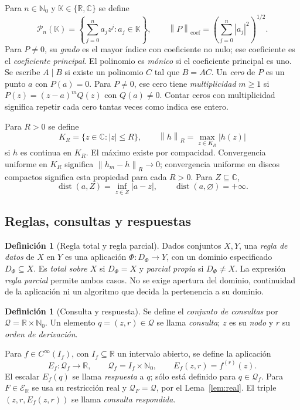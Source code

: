 \documentclass[11pt,a4paper]{article}
\numberwithin{equation}{section}
\theoremstyle{definition}
\newtheorem{definition}[theorem]{Definición}
\theoremstyle{remark}
\newcommand{\R}{\mathbb R}
\newcommand{\C}{\mathbb C}
\newcommand{\Nn}{\mathbb N_0}
\newcommand{\PP}{\mathcal P}
\newcommand{\ER}{\mathcal E_{\R}}
\newcommand{\QQ}{\mathcal Q}
\newcommand{\norm}[1]{\left\lVert#1\right\rVert}
\DeclareMathOperator{\dist}{dist}
\begin{document}
Para $n\in\Nn$ y $\mathbb K\in\{\R,\C\}$ se define
\[
\PP_n(\mathbb K)=\left\{\sum_{j=0}^na_jz^j:a_j\in\mathbb K\right\},\qquad
\norm{P}_{\mathrm{coef}}=\left(\sum_{j=0}^n|a_j|^2\right)^{1/2}.
\]
Para $P\ne0$, su \emph{grado} es el mayor índice con coeficiente no nulo; ese coeficiente es el \emph{coeficiente principal}. El polinomio es \emph{mónico} si el coeficiente principal es uno. Se escribe $A\mid B$ si existe un polinomio $C$ tal que $B=AC$. Un \emph{cero} de $P$ es un punto $a$ con $P(a)=0$. Para $P\ne0$, ese cero tiene \emph{multiplicidad} $m\ge1$ si $P(z)=(z-a)^mQ(z)$ con $Q(a)\ne0$. Contar ceros con multiplicidad significa repetir cada cero tantas veces como indica ese entero.

Para $R>0$ se define
\[
K_R=\{z\in\C:|z|\le R\},\qquad
\norm{h}_R=\max_{z\in K_R}|h(z)|
\]
si $h$ es continua en $K_R$. El máximo existe por compacidad. Convergencia uniforme en $K_R$ significa $\norm{h_m-h}_R\to0$; convergencia uniforme en discos compactos significa esta propiedad para cada $R>0$. Para $Z\subseteq\C$,
\[
\dist(a,Z)=\inf_{z\in Z}|a-z|,\qquad \dist(a,\varnothing)=+\infty.
\]

\subsection{Reglas, consultas y respuestas}
\begin{definition}[Regla total y regla parcial]\label{def:rule}
Dados conjuntos $X,Y$, una \emph{regla de datos} de $X$ en $Y$ es una aplicación $\Phi:D_\Phi\to Y$, con un dominio especificado $D_\Phi\subseteq X$. Es \emph{total sobre $X$} si $D_\Phi=X$ y \emph{parcial propia} si $D_\Phi\ne X$. La expresión \emph{regla parcial} permite ambos casos. No se exige apertura del dominio, continuidad de la aplicación ni un algoritmo que decida la pertenencia a su dominio.
\end{definition}

\begin{definition}[Consulta y respuesta]\label{def:query}
Se define el \emph{conjunto de consultas} por $\QQ=\R\times\Nn$. Un elemento $q=(z,r)\in\QQ$ se llama \emph{consulta}; $z$ es su \emph{nodo} y $r$ su \emph{orden de derivación}.

Para $f\in C^\infty(I_f)$, con $I_f\subseteq\R$ un intervalo abierto, se define la aplicación
\[
E_f:\QQ_f\to\R,\qquad
\QQ_f=I_f\times\Nn,\qquad E_f(z,r)=f^{(r)}(z).
\]
El escalar $E_f(q)$ se llama \emph{respuesta} a $q$; sólo está definido para $q\in\QQ_f$. Para $F\in\ER$ se usa su restricción real y $\QQ_F=\QQ$, por el Lema~\ref{lem:real}. El triple $(z,r,E_f(z,r))$ se llama \emph{consulta respondida}.
\end{definition}
\end{document}
